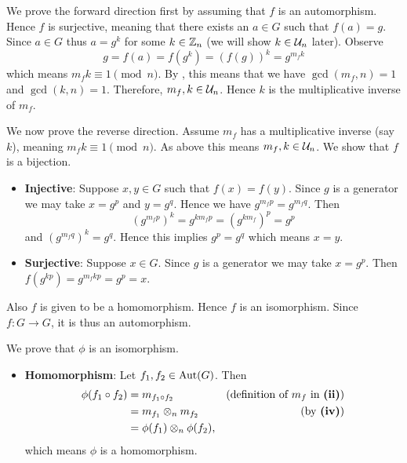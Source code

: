 \begin{questions}
\begin{partquestions}{\roman*}
        \item We prove the forward direction first by assuming that $f$ is an automorphism. Hence $f$ is surjective, meaning that there exists an $a \in G$ such that $f(a) = g$. Since $a \in G$ thus $a = g^k$ for some $k \in \mathbb{Z}_n$ (we will show $k \in \mathcal{U}_{n}$ later). Observe
        \[
            g = f(a) = f(g^k) = (f(g))^k = g^{m_fk}
        \]
        which means $m_fk \equiv 1 \pmod n$. By , this means that we have $\gcd(m_f, n) = 1$ and $\gcd(k, n) = 1$. Therefore, $m_f, k \in \mathcal{U}_{n}$. Hence $k$ is the multiplicative inverse of $m_f$.

        We now prove the reverse direction. Assume $m_f$ has a multiplicative inverse (say $k$), meaning $m_fk \equiv 1 \pmod n$. As above this means $m_f, k \in \mathcal{U}_{n}$. We show that $f$ is a bijection.
        \begin{itemize}
            \item \textbf{Injective}: Suppose $x, y \in G$ such that $f(x) = f(y)$. Since $g$ is a generator we may take $x = g^p$ and $y = g^q$. Hence we have $g^{m_fp} = g^{m_fq}$. Then
            \[
                \left(g^{m_fp}\right)^k = g^{km_fp} = \left(g^{km_f}\right)^p = g^p
            \]
            and $\left(g^{m_fq}\right)^k = g^q$. Hence this implies $g^p = g^q$ which means $x = y$.
            \item \textbf{Surjective}: Suppose $x \in G$. Since $g$ is a generator we may take $x = g^p$. Then $f(g^{kp}) = g^{m_fkp} = g^p = x$.
        \end{itemize}
        Also $f$ is given to be a homomorphism. Hence $f$ is an isomorphism. Since $f: G \to G$, it is thus an automorphism.

        \item We prove that $\phi$ is an isomorphism.
        \begin{itemize}
            \item \textbf{Homomorphism}: Let $f_1, f_2 \in \mathrm{Aut}(G)$. Then
            \begin{align*}
                \phi(f_1\circ f_2) &= m_{f_1\circ f_2} & (\text{definition of } m_f \text{ in }\textbf{(ii)})\\
                &= m_{f_1} \otimes_n m_{f_2} & (\text{by \textbf{(iv)}})\\
                &= \phi(f_1)\otimes_n\phi(f_2),
            \end{align*}
            which means $\phi$ is a homomorphism.


\end{itemize}
\end{partquestions}
\end{questions}
